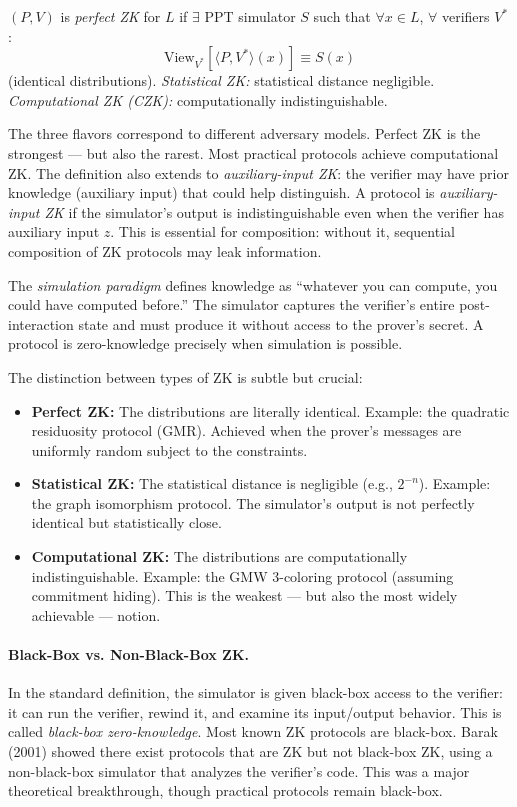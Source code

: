 \begin{definition}
$(P,V)$ is \emph{perfect ZK} for $L$ if $\exists$ PPT simulator $S$ such that $\forall x \in L$, $\forall$ verifiers $V^*$:
\[
\text{View}_{V^*}[\langle P, V^* \rangle(x)] \equiv S(x)
\]
(identical distributions). \emph{Statistical ZK:} statistical distance negligible. \emph{Computational ZK (CZK):} computationally indistinguishable.
\end{definition}

The three flavors correspond to different adversary models. Perfect ZK is the strongest --- but also the rarest. Most practical protocols achieve computational ZK. The definition also extends to \emph{auxiliary-input ZK}: the verifier may have prior knowledge (auxiliary input) that could help distinguish. A protocol is \emph{auxiliary-input ZK} if the simulator's output is indistinguishable even when the verifier has auxiliary input $z$. This is essential for composition: without it, sequential composition of ZK protocols may leak information.

The \emph{simulation paradigm} defines knowledge as ``whatever you can compute, you could have computed before.'' The simulator captures the verifier's entire post-interaction state and must produce it without access to the prover's secret. A protocol is zero-knowledge precisely when simulation is possible.

The distinction between types of ZK is subtle but crucial:
\begin{itemize}
\item \textbf{Perfect ZK:} The distributions are literally identical. Example: the quadratic residuosity protocol (GMR). Achieved when the prover's messages are uniformly random subject to the constraints.
\item \textbf{Statistical ZK:} The statistical distance is negligible (e.g., $2^{-n}$). Example: the graph isomorphism protocol. The simulator's output is not perfectly identical but statistically close.
\item \textbf{Computational ZK:} The distributions are computationally indistinguishable. Example: the GMW 3-coloring protocol (assuming commitment hiding). This is the weakest --- but also the most widely achievable --- notion.
\end{itemize}

\paragraph{Black-Box vs. Non-Black-Box ZK.} In the standard definition, the simulator is given black-box access to the verifier: it can run the verifier, rewind it, and examine its input/output behavior. This is called \emph{black-box zero-knowledge}. Most known ZK protocols are black-box. Barak (2001) showed there exist protocols that are ZK but not black-box ZK, using a non-black-box simulator that analyzes the verifier's code. This was a major theoretical breakthrough, though practical protocols remain black-box.

